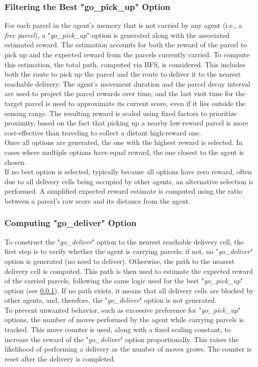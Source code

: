         \subsubsection{Filtering the Best "go\_pick\_up" Option}\label{best_pickup}
            For each parcel in the agent's memory that is not carried by any agent (i.e., a \textit{free parcel}), a "\textit{go\_pick\_up}" option is generated along with the associated estimated reward. The estimation accounts for both the reward of the parcel to pick up and the expected reward from the parcels currently carried. To compute this estimation, the total path, computed via BFS, is considered. This includes both the route to pick up the parcel and the route to deliver it to the nearest reachable delivery. The agent's movement duration and the parcel decay interval are used to project the parcel rewards over time, and the last visit time for the target parcel is used to approximate its current score, even if it lies outside the sensing range. The resulting reward is scaled using fixed factors to prioritize proximity, based on the fact that picking up a nearby low-reward parcel is more cost-effective than traveling to collect a distant high-reward one.
            \medskip\\
            Once all options are generated, the one with the highest reward is selected. In cases where multiple options have equal reward, the one closest to the agent is chosen.
            \medskip\\
            If no best option is selected, typically because all options have zero reward, often due to all delivery cells being occupied by other agents, an alternative selection is performed. A simplified expected reward estimate is computed using the ratio between a parcel's raw score and its distance from the agent.

        \subsubsection{Computing "go\_deliver" Option}
            To construct the "\textit{go\_deliver}" option to the nearest reachable delivery cell, the first step is to verify whether the agent is carrying parcels: if not, no "\textit{go\_deliver}" option is generated (no need to deliver). Otherwise, the path to the nearest delivery cell is computed. This path is then used to estimate the expected reward of the carried parcels, following the same logic used for the best "\textit{go\_pick\_up}" option (see \ref{best_pickup}). If no path exists, it means that all delivery cells are blocked by other agents, and, therefore, the "\textit{go\_deliver}" option is not generated.
            \medskip\\
            To prevent unwanted behavior, such as excessive preference for "\textit{go\_pick\_up}" options, the number of moves performed by the agent while carrying parcels is tracked. This move counter is used, along with a fixed scaling constant, to increase the reward of the "\textit{go\_deliver}" option proportionally. This raises the likelihood of performing a delivery as the number of moves grows. The counter is reset after the delivery is completed.

